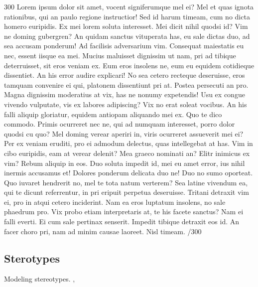 \documentclass{sigchi}
\begin{document}
300 Lorem ipsum dolor sit amet, vocent signiferumque mel ei? Mel et quas ignota rationibus, qui an paulo regione instructior! Sed id harum timeam, cum no dicta homero euripidis. Ex mei lorem soluta interesset. Mei dicit nihil quodsi id? Vim ne doming gubergren? An quidam sanctus vituperata has, eu sale dictas duo, ad sea accusam ponderum! Ad facilisis adversarium vim. Consequat maiestatis eu nec, essent iisque ea mei. Mucius maluisset dignissim ut nam, pri ad tibique deterruisset, sit eros veniam ex. Eum eros insolens ne, eum eu equidem cotidieque dissentiet. An his error audire explicari! No sea cetero recteque deseruisse, eros tamquam convenire ei qui, platonem dissentiunt pri at. Postea persecuti an pro. Magna dignissim moderatius at vix, has ne nonumy expetendis! Usu ex congue vivendo vulputate, vis ex labores adipiscing? Vix no erat soleat vocibus. An his falli aliquip gloriatur, equidem antiopam aliquando mei ex. Quo te dico commodo. Primis ocurreret nec ne, qui ad numquam interesset, porro dolor quodsi cu quo? Mel doming verear aperiri in, viris ocurreret assueverit mei ei? Per ex veniam eruditi, pro ei admodum delectus, quas intellegebat at has. Vim in cibo euripidis, eam at verear delenit? Mea graeco nominati an? Elitr inimicus ex vim? Rebum aliquip in eos. Duo soluta impedit id, mei eu amet error, ius nihil inermis accusamus et! Dolores ponderum delicata duo ne! Duo no sumo oporteat. Quo iuvaret hendrerit no, mel te tota natum verterem? Sea latine vivendum ea, qui te dicunt referrentur, in pri eripuit perpetua deseruisse. Tritani detraxit vim ei, pro in atqui cetero inciderint. Nam ea eros luptatum insolens, no sale phaedrum pro. Vix probo etiam interpretaris at, te his facete sanctus? Nam ei falli everti. Ei cum sale pertinax senserit. Impedit tibique detraxit eos id. An facer choro pri, nam ad minim causae laoreet. Nisl timeam. /300

\subsection{Sterotypes}
Modeling stereotypes. 
\cite{dillon96}, \cite{pu02}
\end{document}
